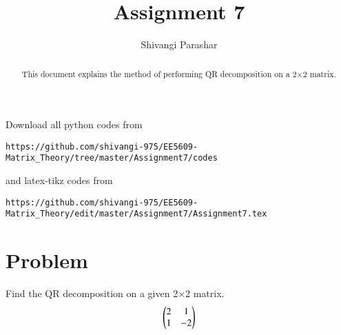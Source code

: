 \documentclass[journal,12pt,twocolumn]{IEEEtran}
\begin{document}
     \def\rightbox#1{\makebox[0in][r]{#1}}
     \def\centbox#1{\makebox[0in]{#1}}
     \def\topbox#1{\raisebox{-\baselineskip}[0in][0in]{#1}}
     \def\midbox#1{\raisebox{-0.5\baselineskip}[0in][0in]{#1}}
\vspace{3cm}
\title{Assignment 7}
\author{Shivangi Parashar}
\maketitle
\newpage
\bigskip
\renewcommand{\thefigure}{\theenumi}
\renewcommand{\thetable}{\theenumi}
\begin{abstract}
This document explains the method of performing QR decomposition on a 2$\times$2 matrix.
\end{abstract}
Download all python codes from 
\begin{lstlisting}
https://github.com/shivangi-975/EE5609-Matrix_Theory/tree/master/Assignment7/codes
\end{lstlisting}
%
and latex-tikz codes from 
%
\begin{lstlisting}
https://github.com/shivangi-975/EE5609-Matrix_Theory/edit/master/Assignment7/Assignment7.tex
\end{lstlisting}
%

\section{Problem}
Find the QR decomposition  on a given 2$\times$2 matrix. 
\begin{align}
    \begin{pmatrix}2&1\\1&-2\end{pmatrix}
\end{align}
\end{document}
